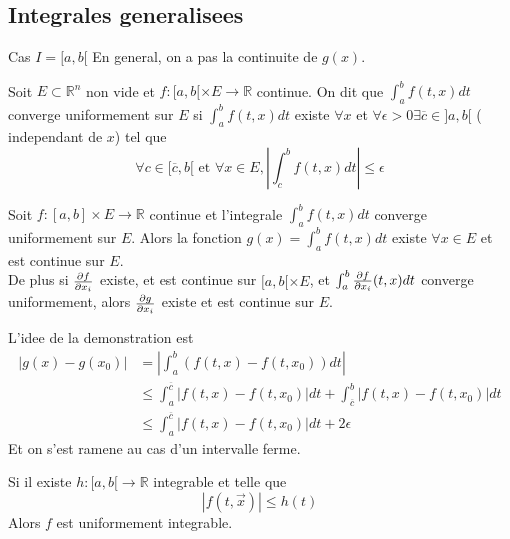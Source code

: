\documentclass[../main.tex]{subfiles}
\begin{document}
\subsection{Integrales generalisees}
Cas $I= [ a,b[ $
En general, on a pas la continuite de $g( x) $.
\begin{defn}
Soit $E \subset \mathbb{R}^n$ non vide et $f:[a,b[\times E \to \mathbb{R}$ continue. On dit que
$ \int_{ a }^{ b }f( t,x) dt$ converge uniformement sur $E$ si $ \int_{ a }^{ b }f( t,x) dt$ existe $\forall x$ et $\forall \epsilon>0 \exists \overline{c}\in ]a,b[$ ( independant de $x$) tel que
\[ 
	\forall c\in [ \overline{c},b[ \text{ et } \forall x \in E, | \int_{ c }^{ b }f( t,x) dt| \leq \epsilon
\]
\end{defn}
\begin{thm}
	Soit $f: [ a,b] \times E \to \mathbb{R}$ continue et l'integrale $ \int_{ a }^{ b }f( t,x) dt$ converge uniformement sur $E$. Alors la fonction $g( x) = \int_{ a }^{ b }f( t,x) dt$ existe $\forall x \in E$ et est continue sur $E$.\\
	De plus si $ \frac{\partial f}{\partial x_i}$ existe, et est continue sur $[a,b[\times E$, et
	$ \int_{ a }^{ b } \frac{\partial f}{\partial x_i}( t,x) dt$ converge uniformement, alors
	$ \frac{\partial g}{\partial x_i}$ existe et est continue sur $E$.
\end{thm}
L'idee de la demonstration est
\begin{align*}
	| g( x) - g( x_0) | &= | \int_{ a }^{ b } ( f( t,x) - f( t,x_0) ) dt|\\
			    &\leq \int_{ a }^{ \overline{c} }| f( t,x) - f( t,x_0) | dt + \int_{ \overline{c} }^{ b } | f( t,x) - f( t,x_0) | dt\\
			    &\leq \int_{ a }^{ \overline{c} }| f( t,x)  - f( t, x_0) | dt + 2 \epsilon
\end{align*}
Et on s'est ramene au cas d'un intervalle ferme.
\begin{rmq}
Si il existe $h:[a,b[ \to \mathbb{R}$ integrable et telle que
\[ 
	|f( t,\vec{x}) | \leq h( t) 
\]
Alors $f$ est uniformement integrable.
\end{rmq}
\end{document}
